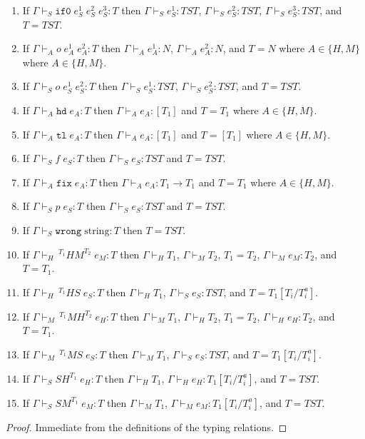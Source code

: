 \begin{lemma}
\begin{enumerate}
\item If $\Gamma\vdash_{S}\mathtt{if0}\;e_{S}^{1}\;e_{S}^{2}\;e_{S}^{3}:T$ then $\Gamma\vdash_{S}e_{S}^{1}:TST$, $\Gamma\vdash_{S}e_{S}^{2}:TST$, $\Gamma\vdash_{S}e_{S}^{3}:TST$, and $T=TST$.
\item If $\Gamma\vdash_{A}o\;e_{A}^{1}\;e_{A}^{2}:T$ then $\Gamma\vdash_{A}e_{A}^{1}:N$, $\Gamma\vdash_{A}e_{A}^{2}:N$, and $T=N$ where $A\in\lbrace H,M\rbrace$ where $A\in\lbrace H,M\rbrace$.
\item If $\Gamma\vdash_{S}o\;e_{S}^{1}\;e_{S}^{2}:T$ then $\Gamma\vdash_{S}e_{S}^{1}:TST$, $\Gamma\vdash_{S}e_{S}^{2}:TST$, and $T=TST$.
\item If $\Gamma\vdash_{A}\mathtt{hd}\;e_{A}:T$ then $\Gamma\vdash_{A}e_{A}:[T_{1}]$ and $T=T_{1}$ where $A\in\lbrace H,M\rbrace$.
\item If $\Gamma\vdash_{A}\mathtt{tl}\;e_{A}:T$ then $\Gamma\vdash_{A}e_{A}:[T_{1}]$ and $T=[T_{1}]$ where $A\in\lbrace H,M\rbrace$.
\item If $\Gamma\vdash_{S}f\;e_{S}:T$ then $\Gamma\vdash_{S}e_{S}:TST$ and $T=TST$.
\item If $\Gamma\vdash_{A}\mathtt{fix}\;e_{A}:T$ then $\Gamma\vdash_{A}e_{A}:T_{1}\rightarrow T_{1}$ and $T=T_{1}$ where $A\in\lbrace H,M\rbrace$.
\item If $\Gamma\vdash_{S}p\;e_{S}:T$ then $\Gamma\vdash_{S}e_{S}:TST$ and $T=TST$.
\item If $\Gamma\vdash_{S}\mathtt{wrong}\;\mathrm{string}:T$ then $T=TST$.
\item If $\Gamma\vdash_{H}\,^{T_{1}}HM^{T_{2}}\;e_{M}:T$ then $\Gamma\vdash_{H}T_{1}$, $\Gamma\vdash_{M}T_{2}$, $T_{1}=T_{2}$, $\Gamma\vdash_{M}e_{M}:T_{2}$, and $T=T_{1}$.
\item If $\Gamma\vdash_{H}\,^{T_{1}}HS\;e_{S}:T$ then $\Gamma\vdash_{H}T_{1}$, $\Gamma\vdash_{S}e_{S}:TST$, and $T=T_{1}[T_{i}/T_{i}^{a}]$.
\item If $\Gamma\vdash_{M}\,^{T_{1}}MH^{T_{2}}\;e_{H}:T$ then $\Gamma\vdash_{M}T_{1}$, $\Gamma\vdash_{H}T_{2}$, $T_{1}=T_{2}$, $\Gamma\vdash_{H}e_{H}:T_{2}$, and $T=T_{1}$.
\item If $\Gamma\vdash_{M}\,^{T_{1}}MS\;e_{S}:T$ then $\Gamma\vdash_{M}T_{1}$, $\Gamma\vdash_{S}e_{S}:TST$, and $T=T_{1}[T_{i}/T_{i}^{a}]$.
\item If $\Gamma\vdash_{S}SH^{T_{1}}\;e_{H}:T$ then $\Gamma\vdash_{H}T_{1}$, $\Gamma\vdash_{H}e_{H}:T_{1}[T_{i}/T_{i}^{a}]$, and $T=TST$.
\item If $\Gamma\vdash_{S}SM^{T_{1}}\;e_{M}:T$ then $\Gamma\vdash_{M}T_{1}$, $\Gamma\vdash_{M}e_{M}:T_{1}[T_{i}/T_{i}^{a}]$, and $T=TST$.
\end{enumerate}
\begin{proof}
Immediate from the definitions of the typing relations.
\end{proof}
\end{lemma}